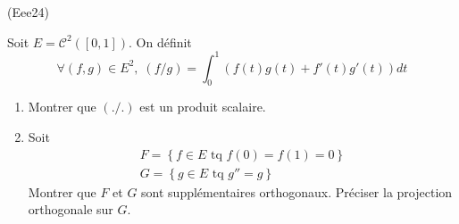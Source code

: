 \begin{tiny}(Eee24)\end{tiny} Soit $E=\mathcal{C}^2([0,1])$. On définit
\begin{displaymath}
\forall (f,g)\in E^2, \;
(f/g) = \int_0^1\left( f(t)g(t) + f'(t)g'(t)\right)dt 
\end{displaymath}
\begin{enumerate}
  \item Montrer que $(./.)$ est un produit scalaire.
  \item Soit 
\begin{multline*}
F = \left\lbrace f\in E\text{ tq } f(0)=f(1)=0 \right\rbrace\\
G = \left\lbrace g\in E \text{ tq } g'' = g\right\rbrace 
\end{multline*}
Montrer que $F$ et $G$ sont supplémentaires orthogonaux. Préciser la projection orthogonale sur $G$.
\end{enumerate}
